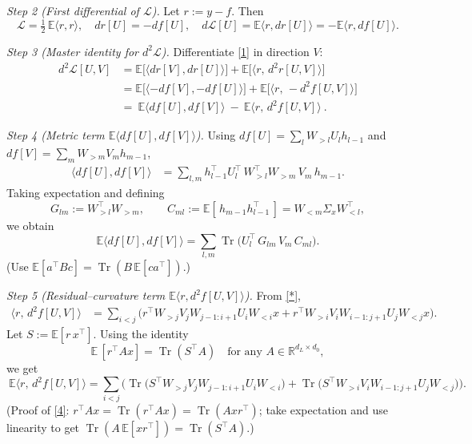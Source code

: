 \documentclass{article}
\theoremstyle{definition}
\begin{document}
\medskip
\emph{Step 2 (First differential of $\mathcal{L}$).}
Let $r:=y-f$. Then
\[
\mathcal{L}=\tfrac12\,\mathbb{E}\langle r,r\rangle,
\quad
dr[U]=-df[U],
\quad
d\mathcal{L}[U]
=\mathbb{E}\langle r,dr[U]\rangle
=-\mathbb{E}\langle r,df[U]\rangle.
\tag{1}
\]

\medskip
\emph{Step 3 (Master identity for $d^2\mathcal{L}$).}
Differentiate \eqref{1} in direction $V$:
\[
\begin{aligned}
d^2\mathcal{L}[U,V]
&= \mathbb{E}\big[\langle dr[V],dr[U]\rangle\big]
+\mathbb{E}\big[\langle r,\,d^2r[U,V]\rangle\big]\\
&=\mathbb{E}\big[\langle -df[V],-df[U]\rangle\big]
+\mathbb{E}\big[\langle r,\,-d^2f[U,V]\rangle\big]\\
&=\boxed{\ \mathbb{E}\langle df[U],df[V]\rangle\ }-
\boxed{\ \mathbb{E}\langle r,\,d^2f[U,V]\rangle\ }.
\end{aligned}
\tag{2}
\]

\medskip
\emph{Step 4 (Metric term $\mathbb{E}\langle df[U],df[V]\rangle$).}
Using $df[U]=\sum_l W_{>l}U_lh_{l-1}$ and $df[V]=\sum_m W_{>m}V_mh_{m-1}$,
\[
\begin{aligned}
\langle df[U],df[V]\rangle
&=\sum_{l,m} h_{l-1}^\top U_l^\top\, W_{>l}^\top W_{>m}\, V_m\, h_{m-1}.
\end{aligned}
\]
Taking expectation and defining
\[
G_{lm}:=W_{>l}^\top W_{>m},\qquad
C_{ml}:=\mathbb{E}[\,h_{m-1}h_{l-1}^\top\,]=W_{<m}\Sigma_x W_{<l}^\top,
\]
we obtain
\[
\boxed{\ \mathbb{E}\langle df[U],df[V]\rangle
=\sum_{l,m}\operatorname{Tr}\!\big(U_l^\top\,G_{lm}\,V_m\,C_{ml}\big). \ }
\tag{3}
\]
(Use $\mathbb{E}[a^\top B c]=\operatorname{Tr}(B\,\mathbb{E}[ca^\top])$.)

\medskip
\emph{Step 5 (Residual–curvature term $\mathbb{E}\langle r,d^2f[U,V]\rangle$).}
From \eqref{*},
\[
\begin{aligned}
\langle r,\,d^2 f[U,V]\rangle
&=\sum_{i<j}\!\Big(
r^\top W_{>j}V_jW_{j-1:i+1}U_iW_{<i}x
+
r^\top W_{>i}V_iW_{i-1:j+1}U_jW_{<j}x
\Big).
\end{aligned}
\]
Let $S:=\mathbb{E}[r\,x^\top]$. Using the identity
\[
\mathbb{E}\,[r^\top A x]=\operatorname{Tr}(S^\top A)
\quad\text{for any }A\in\mathbb{R}^{d_L\times d_0},
\tag{4}
\]
we get
\[
\boxed{\ \mathbb{E}\langle r,\,d^2 f[U,V]\rangle
=\sum_{i<j}\!\Big(
\operatorname{Tr}\!\big(S^\top W_{>j}V_jW_{j-1:i+1}U_iW_{<i}\big)
+\operatorname{Tr}\!\big(S^\top W_{>i}V_iW_{i-1:j+1}U_jW_{<j}\big)
\Big). \ }
\tag{5}
\]
(Proof of \eqref{4}: $r^\top A x=\operatorname{Tr}(r^\top A x)=\operatorname{Tr}(A x r^\top)$; take expectation and use linearity to get $\operatorname{Tr}(A\,\mathbb{E}[x r^\top])=\operatorname{Tr}(S^\top A)$.)
\end{document}
